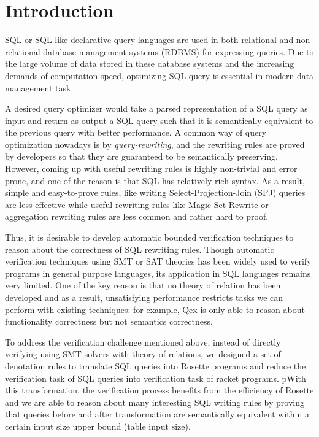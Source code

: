 \section{Introduction}

SQL or SQL-like declarative query languages are used in both relational and non-relational database management systems (RDBMS) for expressing queries. Due to the large volume of data stored in these database systems and the increasing demands of computation speed, optimizing SQL query is essential in modern data management task. 

A desired query optimizer would take a parsed representation of a SQL query as input and return as output a SQL query such that it is semantically equivalent to the previous query with better performance. A common way of query optimization nowadays is by \emph{query-rewriting}, and the rewriting rules are proved by developers so that they are guaranteed to be semantically preserving. However, coming up with useful rewriting rules is highly non-trivial and error prone, and one of the reason is that SQL has relatively rich syntax. As a result, simple and easy-to-prove rules, like writing Select-Projection-Join (SPJ) queries are less effective while useful rewriting rules like Magic Set Rewrite or aggregation rewriting rules are less common and rather hard to proof.

Thus, it is desirable to develop automatic bounded verification techniques to reason about the correctness of SQL rewriting rules. Though automatic verification techniques using SMT or SAT theories has been widely used to verify programs in general purpose languages, its application in SQL languages remains very limited. One of the key reason is that no theory of relation has been developed and as a result, unsatisfying performance restricts tasks we can perform with existing techniques: for example, Qex is only able to reason about functionality correctness but not semantics correctness.

To address the verification challenge mentioned above, instead of directly verifying using SMT solvers with theory of relations, we designed a set of denotation rules to translate SQL queries into Rosette programs and reduce the verification task of SQL queries into verification task of racket programs. pWith this transformation, the verification process benefits from the efficiency of Rosette and we are able to reason about many interesting SQL writing rules by proving that queries before and after transformation are semantically equivalent within a certain input size upper bound (table input size).

